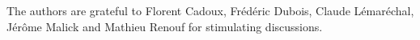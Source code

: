 \documentclass[graybox]{svmult}
\begin{document}
\abstract*{\ourabstract}

\abstract{\ourabstract}





\begin{acknowledgement}
The authors are grateful to Florent Cadoux, Fr\'ed\'eric Dubois, Claude L\'emar\'echal, J\'er\^ome Malick and Mathieu Renouf  for stimulating discussions.
\end{acknowledgement}
%




%



%
\end{document}

